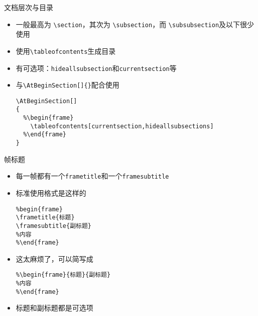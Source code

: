 \begin{frame}[fragile]{文档层次与目录}
	\begin{itemize}
		\item 一般最高为 \verb|\section|，其次为 \verb|\subsection|，而 \verb|\subsubsection|及以下很少使用
		\item 使用\verb|\tableofcontents|生成目录
		\item 有可选项：\verb|hideallsubsection|和\verb|currentsection|等
		\item 与\verb|\AtBeginSection[]{}|配合使用
\begin{lstlisting}
\AtBeginSection[]
{
  %\begin{frame}
    \tableofcontents[currentsection,hideallsubsections]
  %\end{frame}
}
\end{lstlisting}
	\end{itemize}
\end{frame}
\begin{frame}[fragile]{帧标题}
	\begin{itemize}
		\item 每一帧都有一个\texttt{frametitle}和一个\texttt{framesubtitle}
		\item 标准使用格式是这样的
\begin{lstlisting}
%begin{frame}
\frametitle{标题}
\framesubtitle{副标题}
%内容
%\end{frame}
\end{lstlisting}
		\item 这太麻烦了，可以简写成
\begin{lstlisting}
%\begin{frame}{标题}{副标题}
%内容
%\end{frame}
\end{lstlisting}
		\item 标题和副标题都是可选项
	\end{itemize}
\end{frame}
